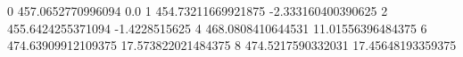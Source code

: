 0 457.0652770996094 0.0
1 454.73211669921875 -2.333160400390625
2 455.6424255371094 -1.4228515625
4 468.0808410644531 11.01556396484375
6 474.63909912109375 17.573822021484375
8 474.5217590332031 17.45648193359375
